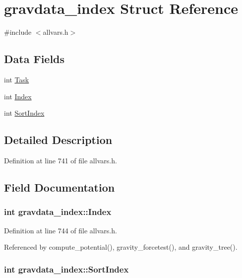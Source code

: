 \hypertarget{structgravdata__index}{
\section{gravdata\_\-index Struct Reference}
\label{structgravdata__index}
}


{\ttfamily \#include $<$allvars.h$>$}

\subsection*{Data Fields}
\begin{DoxyCompactItemize}
\item 
int \hyperlink{structgravdata__index_afacf7009bcd9677cf8ddff3dc927d6c5}{Task}
\item 
int \hyperlink{structgravdata__index_aac6e682d48cdd924a09384b4551b678e}{Index}
\item 
int \hyperlink{structgravdata__index_a34600f886624e73eb38845cb5d51d04c}{SortIndex}
\end{DoxyCompactItemize}


\subsection{Detailed Description}


Definition at line 741 of file allvars.h.



\subsection{Field Documentation}
\hypertarget{structgravdata__index_aac6e682d48cdd924a09384b4551b678e}{
\subsubsection[{Index}]{\setlength{\rightskip}{0pt plus 5cm}int {\bf gravdata\_\-index::Index}}}
\label{structgravdata__index_aac6e682d48cdd924a09384b4551b678e}


Definition at line 744 of file allvars.h.



Referenced by compute\_\-potential(), gravity\_\-forcetest(), and gravity\_\-tree().

\hypertarget{structgravdata__index_a34600f886624e73eb38845cb5d51d04c}{
\subsubsection[{SortIndex}]{\setlength{\rightskip}{0pt plus 5cm}int {\bf gravdata\_\-index::SortIndex}}}
\label{structgravdata__index_a34600f886624e73eb38845cb5d51d04c}


